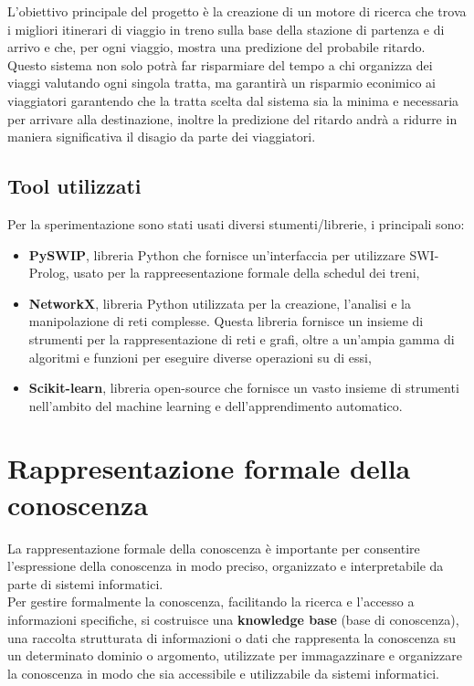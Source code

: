 \documentclass[italian,12pt,a4paper]{article}
\begin{document}
	L'obiettivo principale del progetto è la creazione di un motore di ricerca che trova i migliori itinerari di viaggio in treno sulla base della stazione di partenza e di arrivo e che, per ogni viaggio, mostra una predizione del probabile ritardo.\\
	Questo sistema non solo potrà far risparmiare del tempo a chi organizza dei viaggi valutando ogni singola tratta, ma garantirà un risparmio econimico ai viaggiatori garantendo che la tratta scelta dal sistema sia la minima e necessaria per arrivare alla destinazione, inoltre la predizione del ritardo andrà a ridurre in maniera significativa il disagio da parte dei viaggiatori. 
	
	
	\subsection{Tool utilizzati}
	Per la sperimentazione sono stati usati diversi stumenti/librerie, i principali sono:
	
		\begin{itemize}
			\item \textbf{PySWIP}, libreria Python che fornisce un'interfaccia per utilizzare SWI-Prolog, usato per la rappreesentazione formale della schedul dei treni,
			\item \textbf{NetworkX}, libreria Python utilizzata per la creazione, l'analisi e la manipolazione di reti complesse. Questa libreria fornisce un insieme di strumenti per la rappresentazione di reti e grafi, oltre a un'ampia gamma di algoritmi e funzioni per eseguire diverse operazioni su di essi,
			\item \textbf{Scikit-learn}, libreria open-source che fornisce un vasto insieme di strumenti nell'ambito del machine learning e dell'apprendimento automatico.
		\end{itemize}

	\section{Rappresentazione formale della conoscenza}
	
	La rappresentazione formale della conoscenza è importante per consentire l'espressione della conoscenza in modo preciso, organizzato e interpretabile da parte di sistemi informatici.\\
	Per gestire formalmente la conoscenza, facilitando la ricerca e l'accesso a informazioni specifiche, si costruisce una \textbf{knowledge base} (base di conoscenza), una raccolta strutturata di informazioni o dati che rappresenta la conoscenza su un determinato dominio o argomento, utilizzate per immagazzinare e organizzare la conoscenza in modo che sia accessibile e utilizzabile da sistemi informatici.
	
\end{document}
